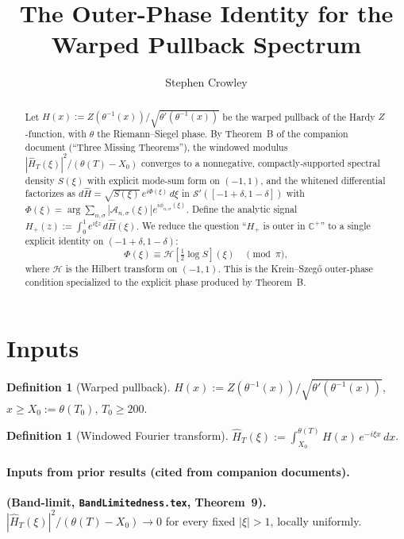 \documentclass[11pt]{article}
\title{The Outer-Phase Identity for the Warped Pullback Spectrum}
\author{Stephen Crowley}
\date{}
\theoremstyle{definition}
\newtheorem{definition}[theorem]{Definition}
\newcommand{\C}{\mathbb{C}}
\newcommand{\Cpls}{\C^+}
\newcommand{\Sprime}{\mathcal{S}'}
\begin{document}
\maketitle

\begin{abstract}
Let $H(x) := Z(\theta^{-1}(x))/\sqrt{\theta'(\theta^{-1}(x))}$ be the warped pullback of the Hardy $Z$-function, with $\theta$ the Riemann--Siegel phase. By Theorem~B of the companion document (``Three Missing Theorems''), the windowed modulus $|\widehat H_T(\xi)|^2/(\theta(T) - X_0)$ converges to a nonnegative, compactly-supported spectral density $S(\xi)$ with explicit mode-sum form on $(-1,1)$, and the whitened differential factorizes as $d\widehat H = \sqrt{S(\xi)}\,e^{i\Phi(\xi)}\,d\xi$ in $\Sprime([-1+\delta, 1-\delta])$ with $\Phi(\xi) = \arg\sum_{n,\sigma}|\mathcal A_{n,\sigma}(\xi)|e^{i\phi_{n,\sigma}(\xi)}$. Define the analytic signal $H_+(z) := \int_0^1 e^{i\xi z}\,d\widehat H(\xi)$. We reduce the question ``$H_+$ is outer in $\Cpls$'' to a single explicit identity on $(-1+\delta, 1-\delta)$:
\[
\Phi(\xi) \equiv \mathcal H\!\left[\tfrac12 \log S\right](\xi) \quad \pmod{\pi},
\]
where $\mathcal H$ is the Hilbert transform on $(-1,1)$. This is the Krein--Szeg\H{o} outer-phase condition specialized to the explicit phase produced by Theorem~B.
\end{abstract}

\section{Inputs}

\begin{definition}[Warped pullback]
$H(x) := Z(\theta^{-1}(x))/\sqrt{\theta'(\theta^{-1}(x))}$, $x \geq X_0 := \theta(T_0)$, $T_0 \geq 200$.
\end{definition}

\begin{definition}[Windowed Fourier transform]
$\widehat H_T(\xi) := \int_{X_0}^{\theta(T)} H(x)\, e^{-i\xi x}\, dx$.
\end{definition}

\paragraph{Inputs from prior results (cited from companion documents).}

\textbf{(Band-limit, \texttt{BandLimitedness.tex}, Theorem~9).} $|\widehat H_T(\xi)|^2/(\theta(T) - X_0) \to 0$ for every fixed $|\xi| > 1$, locally uniformly.
\end{document}
